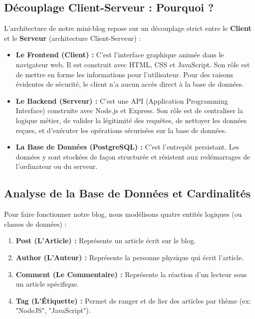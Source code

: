 \subsection{Découplage Client-Serveur : Pourquoi ?}
L'architecture de notre mini-blog repose sur un découplage strict entre le \textbf{Client} et le \textbf{Serveur} (architecture Client-Serveur) :
\begin{itemize}
    \item \textbf{Le Frontend (Client) :} C'est l'interface graphique animée dans le navigateur web. Il est construit avec HTML, CSS et JavaScript. Son rôle est de mettre en forme les informations pour l'utilisateur. Pour des raisons évidentes de sécurité, le client n'a aucun accès direct à la base de données.
    \item \textbf{Le Backend (Serveur) :} C'est une API (Application Programming Interface) construite avec Node.js et Express. Son rôle est de centraliser la logique métier, de valider la légitimité des requêtes, de nettoyer les données reçues, et d'exécuter les opérations sécurisées sur la base de données.
    \item \textbf{La Base de Données (PostgreSQL) :} C'est l'entrepôt persistant. Les données y sont stockées de façon structurée et résistent aux redémarrages de l'ordinateur ou du serveur.
\end{itemize}

\subsection{Analyse de la Base de Données et Cardinalités}
Pour faire fonctionner notre blog, nous modélisons quatre entités logiques (ou classes de données) :
\begin{enumerate}
    \item \textbf{Post (L'Article) :} Représente un article écrit sur le blog.
    \item \textbf{Author (L'Auteur) :} Représente la personne physique qui écrit l'article.
    \item \textbf{Comment (Le Commentaire) :} Représente la réaction d'un lecteur sous un article spécifique.
    \item \textbf{Tag (L'Étiquette) :} Permet de ranger et de lier des articles par thème (ex: "NodeJS", "JavaScript").
\end{enumerate}

